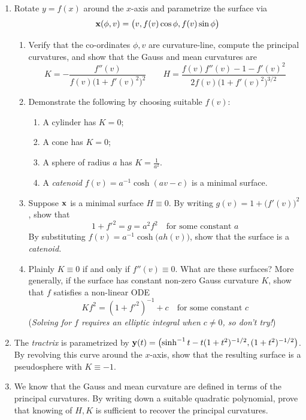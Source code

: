 \begin{exercises}{}{}
\begin{enumerate}
	\goodbreak


	\item\label{exs:curvlinerotation} Rotate $y=f(x)$ around the $x$-axis and parametrize the surface via
	\[
		{\mathbf{x}}(\phi,v)=\bigl(v,f(v)\cos\phi,f(v)\sin\phi\bigr)
	\]
	\begin{enumerate}
	  \item Verify that the co-ordinates $\phi,v$ are curvature-line, compute the principal curvatures, and show that the Gauss and mean curvatures are
		\[
			K=-\frac{f''(v)}{f(v)\bigl(1+f'(v)^2\bigr)^2}\qquad H=\frac{f(v)f''(v)-1-f'(v)^2}{2f(v)\bigl(1+f'(v)^2\bigr)^{3/2}}
		\]
		\item Demonstrate the following by choosing suitable $f(v)$:
		\begin{enumerate}
		  \item A cylinder has $K=0$;
		  \item A cone has $K=0$;
		  \item A sphere of radius $a$ has $K=\frac 1{a^2}$.
		  \item A \emph{catenoid} $f(v)=a^{-1}\cosh(av-c)$ is a minimal surface.
		\end{enumerate}

	  \item Suppose ${\mathbf{x}}$ is a minimal surface $H\equiv 0$. By writing $g(v)=1+\bigl(f'(v)\bigr)^2$, show that
	  \[
	  	1+f'^2=g=a^2f^2 \quad\text{for some constant $a$}
	  \]
	  By substituting $f(v)=a^{-1}\cosh\bigl(ah(v)\bigr)$, show that the surface is a \emph{catenoid.}
	  
	  \item Plainly $K\equiv 0$ if and only if $f''(v)\equiv 0$. What are these surfaces? More generally, if the surface has constant non-zero Gauss curvature $K$, show that $f$ satisfies a non-linear ODE
	  \[
	  	Kf^2=(1+f'^2)^{-1}+c \quad\text{for some constant $c$}
	  \]
	  (\emph{Solving for $f$ requires an elliptic integral when $c\neq 0$, so don't try!})
	\end{enumerate}
	
	
	\item The \emph{tractrix} is parametrized by ${\mathbf{y}}(t)=\bigl(\sinh^{-1}t-t(1+t^2)^{-1/2}, (1+t^2)^{-1/2}\bigr)$. By revolving this curve around the $x$-axis, show that the resulting surface is a pseudosphere with $K\equiv -1$.
	
	
  \item We know that the Gauss and mean curvature are defined in terms of the principal curvatures. By writing down a suitable quadratic polynomial, prove that knowing of $H,K$ is sufficient to recover the principal curvatures.
	

\end{enumerate}
\end{exercises}
